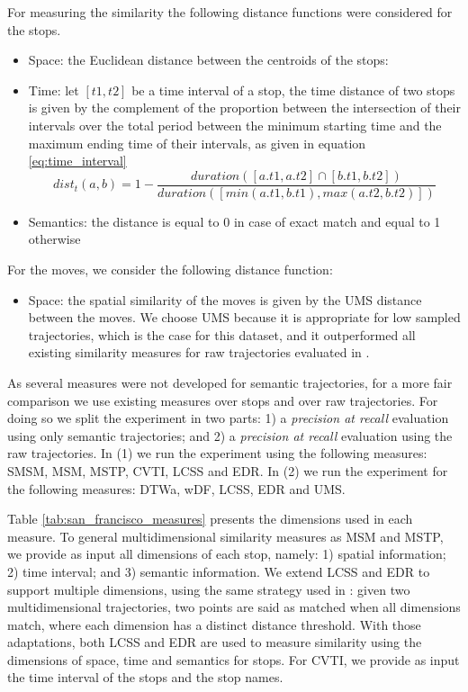 \documentclass[12pt]{article}
\begin{document}
For measuring the similarity the following distance functions were considered for the stops.
\begin{itemize}
  \item Space: the Euclidean distance between the centroids of the stops:
	\item Time: let $[t1, t2]$ be a time interval of a stop, the time distance of two stops is given by the complement of the proportion between the intersection of their intervals over the total period between the minimum starting time and the maximum ending time of their intervals, as given in equation \ref{eq:time_interval}
\begin{equation} \label{eq:time_interval}
	dist_t(a, b) = 1 - \dfrac{duration([a.t1, a.t2] \cap [b.t1, b.t2])}{duration([min(a.t1, b.t1), max(a.t2, b.t2)])}
\end{equation}
  \item Semantics: the distance is equal to 0 in case of exact match and equal to 1 otherwise
\end{itemize}

For the moves, we consider the following distance function:
\begin{itemize}
  \item Space: the spatial similarity of the moves is given by the UMS distance between the moves. We choose UMS because it is appropriate for low sampled trajectories, which is the case for this dataset, and it outperformed all existing similarity measures for raw trajectories evaluated in \cite{Furtado-UMS-2018}.
\end{itemize}

As several measures were not developed for semantic trajectories, for a more fair comparison we use existing measures over stops and over raw trajectories. For doing so we split the experiment in two parts: 1) a \textit{precision at recall} evaluation using only semantic trajectories; and 2) a \textit{precision at recall} evaluation using the raw trajectories. In (1) we run the experiment using the following measures: SMSM, MSM, MSTP, CVTI, LCSS and EDR. In (2) we run the experiment for the following measures: DTWa, wDF, LCSS, EDR and UMS.

Table {\ref{tab:san_francisco_measures}} presents the dimensions used in each measure. To general multidimensional similarity measures as MSM and MSTP, we provide as input all dimensions of each stop, namely: 1)  spatial information; 2) time interval; and 3) semantic information. We extend LCSS and EDR to support multiple dimensions, using the same strategy used in {\cite{Furtado:TGIS12156}}: given two multidimensional trajectories, two points are said as matched when all dimensions match, where each dimension has a distinct distance threshold. With those adaptations, both LCSS and EDR are used to measure similarity using the dimensions of space, time and semantics for stops. For CVTI, we provide as input the time interval of the stops and the stop names.
\end{document}
